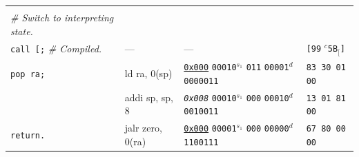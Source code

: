 \documentclass[a4paper,12pt,final]{article}
\begin{document}
\begin{table}[!htbp]
\begin{adjustwidth}{-1cm}{-1cm}
\begin{center}
\begin{tabular}{l|ll|l}
 &  &  & \\[0pt]
\emph{\# Switch to interpreting state.} &  &  & \\[0pt]
\texttt{call [;}  \emph{\# Compiled.} & --- & --- & \texttt{[99} \(^{c}\)​\texttt{5B}​\(_{[}\)​\texttt{]}\\[0pt]
\texttt{pop ra;} & ld ra, 0(sp) & \uline{\texttt{0x000}}                    \texttt{00010}​\(^{s_{1}}\) \texttt{011} \texttt{00001}​\(^{d}\)  \texttt{0000011} & \texttt{83 30 01 00}\\[0pt]
 & addi sp, sp, 8 & \emph{\texttt{0x008}}                    \texttt{00010}​\(^{s_{1}}\) \texttt{000} \texttt{00010}​\(^{d}\)  \texttt{0010011} & \texttt{13 01 81 00}\\[0pt]
\texttt{return.} & jalr zero, 0(ra) & \uline{\texttt{0x000}}                    \texttt{00001}​\(^{s_{1}}\) \texttt{000} \texttt{00000}​\(^{d}\)  \texttt{1100111} & \texttt{67 80 00 00}\\[0pt]
\end{tabular}

\end{center}
\normalsize \end{adjustwidth} \end{table} \vspace{0}
\end{document}
